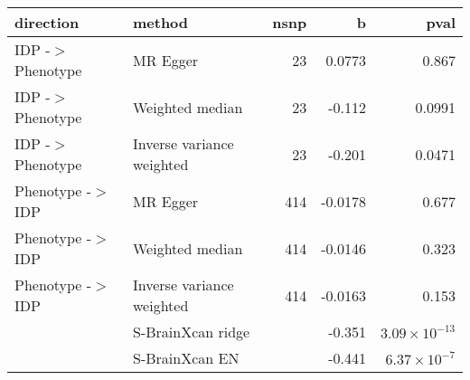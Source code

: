 \begin{table}[ht]
\centering
\begin{tabular}{llrrr}
  \toprule
{\textbf{direction}} & {\textbf{method}} & {\textbf{nsnp}} & {\textbf{b}} & {\textbf{pval}} \\ 
  \midrule
IDP -$>$ Phenotype & MR Egger &   23 & 0.0773 & 0.867 \\ 
  IDP -$>$ Phenotype & Weighted median &   23 & -0.112 & 0.0991 \\ 
  IDP -$>$ Phenotype & Inverse variance weighted &   23 & -0.201 & 0.0471 \\ 
  Phenotype -$>$ IDP & MR Egger &  414 & -0.0178 & 0.677 \\ 
  Phenotype -$>$ IDP & Weighted median &  414 & -0.0146 & 0.323 \\ 
  Phenotype -$>$ IDP & Inverse variance weighted &  414 & -0.0163 & 0.153 \\ 
   & S-BrainXcan ridge &  & -0.351 & $3.09 \times 10^{-13}$ \\ 
   & S-BrainXcan EN &  & -0.441 & $6.37 \times 10^{-7}$ \\ 
   \bottomrule
\end{tabular}
\end{table}
